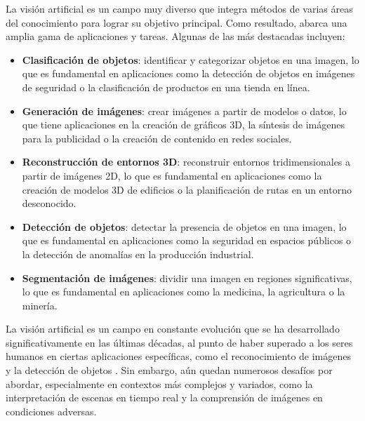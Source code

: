 La visión artificial es un campo muy diverso que integra métodos de varias áreas del conocimiento para lograr su objetivo principal. Como resultado, abarca una amplia gama de aplicaciones y tareas. Algunas de las más destacadas incluyen:

\begin{itemize} 
	\item \textbf{Clasificación de objetos}: identificar y categorizar objetos en una imagen, lo que es fundamental en aplicaciones como la detección de objetos en imágenes de seguridad o la clasificación de productos en una tienda en línea. 
	\item \textbf{Generación de imágenes}: crear imágenes a partir de modelos o datos, lo que tiene aplicaciones en la creación de gráficos 3D, la síntesis de imágenes para la publicidad o la creación de contenido en redes sociales. 
	\item \textbf{Reconstrucción de entornos 3D}: reconstruir entornos tridimensionales a partir de imágenes 2D, lo que es fundamental en aplicaciones como la creación de modelos 3D de edificios o la planificación de rutas en un entorno desconocido. 
	\item \textbf{Detección de objetos}: detectar la presencia de objetos en una imagen, lo que es fundamental en aplicaciones como la seguridad en espacios públicos o la detección de anomalías en la producción industrial. 
	\item \textbf{Segmentación de imágenes}: dividir una imagen en regiones significativas, lo que es fundamental en aplicaciones como la medicina, la agricultura o la minería. 
\end{itemize}

La visión artificial es un campo en constante evolución que se ha desarrollado significativamente en las últimas décadas, al punto de haber superado a los seres humanos en ciertas aplicaciones específicas, como el reconocimiento de imágenes \cite{5206848} y la detección de objetos \cite{wang2022yolov7trainablebagoffreebiessets}. Sin embargo, aún quedan numerosos desafíos por abordar, especialmente en contextos más complejos y variados, como la interpretación de escenas en tiempo real y la comprensión de imágenes en condiciones adversas.

\endinput
